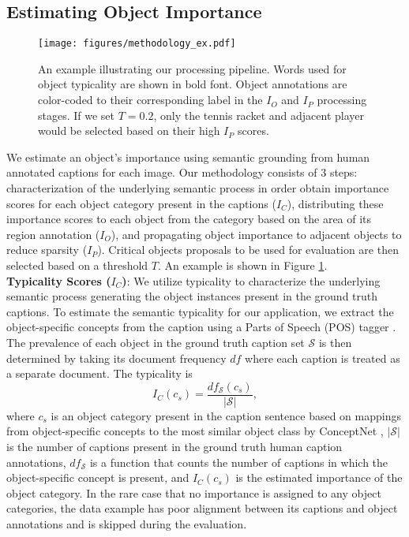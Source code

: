 \documentclass[10pt,twocolumn,letterpaper]{article}
\begin{document}
\subsection{Estimating Object Importance}
\begin{figure}
\centering
\def\svgwidth{\columnwidth}
\texttt{[image: figures/methodology\_ex.pdf]}
\caption{An example illustrating our processing pipeline. Words used for object typicality are shown in bold font. Object annotations are color-coded to their corresponding label in the $I_O$ and $I_P$ processing stages. If we set $T=0.2$, only the tennis racket and adjacent player would be selected based on their high $I_P$ scores.}
\label{methodology-table}
\end{figure}
We estimate an object's importance using semantic grounding from human annotated captions for each image.  Our methodology consists of 3 steps: characterization of the underlying semantic process in order obtain importance scores for each object category present in the captions ($I_C$), distributing these importance scores to each object from the category based on the area of its region annotation ($I_O$), and propagating object importance to adjacent objects to reduce sparsity ($I_P$). Critical objects proposals to be used for evaluation are then selected based on a threshold $T$. An example is shown in Figure \ref{methodology-table}.\vspace{1mm}\\
\textbf{Typicality Scores ($I_C$)}: We utilize typicality \cite{smurf2021,typicality1997} to characterize the underlying semantic process generating the object instances present in the ground truth captions. To estimate the semantic typicality for our application, we extract the object-specific concepts from the caption using a Parts of Speech (POS) tagger \cite{spacy2017}. The prevalence of each object in the ground truth caption set $\mathcal{S}$ is then determined by taking its document frequency $df$ where each caption is treated as a separate document. The typicality is 
\begin{equation}
I_C(c_s)=\frac{df_{\mathcal{S}}(c_s)}{|\mathcal{S}|},
\end{equation}
where $c_s$ is an object category present in the caption sentence based on mappings from object-specific concepts to the most similar object class by ConceptNet \cite{conceptnet2018}, $|\mathcal{S}|$ is the number of captions present in the ground truth human caption annotations, $df_{\mathcal{S}}$ is a function that counts the number of captions in which the object-specific concept is present, and $I_C(c_s)$ is the estimated importance of the object category. In the rare case that no importance is assigned to any object categories, the data example has poor alignment between its captions and object annotations and is skipped during the evaluation.\vspace{1mm}\\
\end{document}
